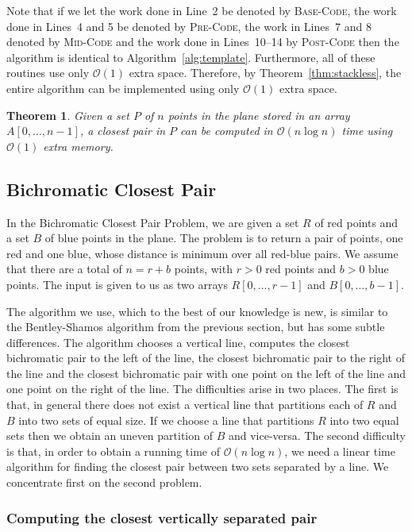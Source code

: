 \documentclass{elsart}
\newcommand{\Oh}[1]{\ensuremath{\mathcal{O}(#1)}}
\newtheorem{theorem}{Theorem}
\begin{document}
Note that if we let the work done in Line~2 be denoted by
\textsc{Base-Code}, the work done in Lines~4 and 5 be denoted by
\textsc{Pre-Code}, the work in Lines~7 and 8 denoted by
\textsc{Mid-Code} and the work done in Lines~10--14 by
\textsc{Post-Code} then the algorithm is identical to
Algorithm~\ref{alg:template}.  Furthermore, all of these routines use
only $\Oh{1}$ extra space. Therefore, by Theorem~\ref{thm:stackless},
the entire algorithm can be implemented using only $\Oh{1}$ extra space.

\begin{theorem}
  Given a set $P$ of $n$ points in the plane stored in an array
  $A[0, \ldots, n-1]$, a closest pair in $P$ can be computed in
  \Oh{n \log n} time using \Oh{1} extra memory.
\end{theorem}


\subsection{Bichromatic Closest Pair}

In the Bichromatic Closest Pair Problem, we are given a set $R$ of red
points and a set $B$ of blue points in the plane. The problem is to
return a pair of points, one red and one blue, whose distance is
minimum over all red-blue pairs. We assume that there are a total of
$n=r+b$ points, with $r>0$ red points and $b>0$ blue points.  The
input is given to us as two arrays $R[0,\ldots,r-1]$ and
$B[0,\ldots,b-1]$. 
 
The algorithm we use, which to the best of our knowledge is new, is
similar to the Bentley-Shamos algorithm from the previous section, but
has some subtle differences.  The algorithm chooses a vertical line,
computes the closest bichromatic pair to the left of the line, the
closest bichromatic pair to the right of the line and the closest
bichromatic pair with one point on the left of the line and one point
on the right of the line.  The difficulties arise in two places.  The
first is that, in general there does not exist a vertical line that
partitions each of $R$ and $B$ into two sets of equal size.  If we
choose a line that partitions $R$ into two equal sets then we obtain
an uneven partition of $B$ and vice-versa.  The second difficulty is
that, in order to obtain a running time of \Oh{n\log n}, we need a
linear time algorithm for finding the closest pair between two sets
separated by a line.  We concentrate first on the second problem.

\subsubsection{Computing the closest vertically separated pair}
\end{document}
